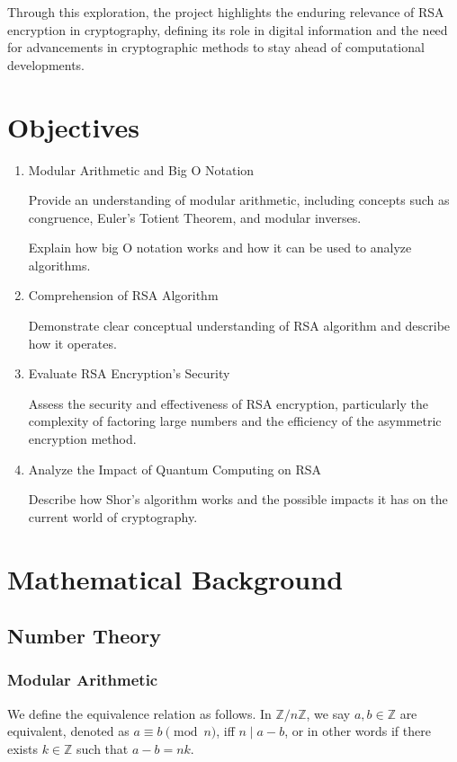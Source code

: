 \documentclass{article}
\newcommand{\Z}{\mathbb{Z}}
\begin{document}
Through this exploration, the project highlights the enduring relevance of RSA encryption in cryptography, defining its role in digital information and the need for advancements in cryptographic methods to stay ahead of computational developments.

\section{Objectives}
\begin{enumerate}
    \item Modular Arithmetic and Big O Notation
    
    Provide an understanding of modular arithmetic, including concepts such as congruence, Euler's Totient Theorem, and modular inverses.
    
    Explain how big O notation works and how it can be used to analyze algorithms.

    \item Comprehension of RSA Algorithm

    Demonstrate clear conceptual understanding of RSA algorithm and describe how it operates.

    \item Evaluate RSA Encryption's Security

    Assess the security and effectiveness of RSA encryption, particularly the complexity of factoring large numbers and the efficiency of the asymmetric encryption method.
    
    \item Analyze the Impact of Quantum Computing on RSA

    Describe how Shor's algorithm works and the possible impacts it has on the current world of cryptography.
    
\end{enumerate}
\section{Mathematical Background}
\subsection{Number Theory}
\subsubsection{Modular Arithmetic}
We define the equivalence relation as follows. In $\Z/n \Z$, we say $a, b \in \Z$ are equivalent, denoted as $a \equiv b \pmod n$, iff $n \mid a - b$, or in other words if there exists $k \in \Z$ such that $a - b = n k$.
\end{document}
